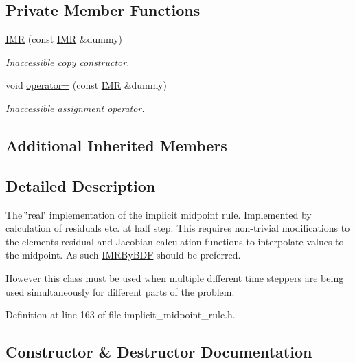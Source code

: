\subsection*{Private Member Functions}
\begin{DoxyCompactItemize}
\item 
\hyperlink{classoomph_1_1IMR_a1c55b18131b75531e320a50aeecdf00c}{I\+MR} (const \hyperlink{classoomph_1_1IMR}{I\+MR} \&dummy)
\begin{DoxyCompactList}\small\item\em Inaccessible copy constructor. \end{DoxyCompactList}\item 
void \hyperlink{classoomph_1_1IMR_a694b371e73e3ee940e3473d9a9add90f}{operator=} (const \hyperlink{classoomph_1_1IMR}{I\+MR} \&dummy)
\begin{DoxyCompactList}\small\item\em Inaccessible assignment operator. \end{DoxyCompactList}\end{DoxyCompactItemize}
\subsection*{Additional Inherited Members}


\subsection{Detailed Description}
The \char`\"{}real\char`\"{} implementation of the implicit midpoint rule. Implemented by calculation of residuals etc. at half step. This requires non-\/trivial modifications to the element\textquotesingle{}s residual and Jacobian calculation functions to interpolate values to the midpoint. As such \hyperlink{classoomph_1_1IMRByBDF}{I\+M\+R\+By\+B\+DF} should be preferred.

However this class must be used when multiple different time steppers are being used simultaneously for different parts of the problem. 

Definition at line 163 of file implicit\+\_\+midpoint\+\_\+rule.\+h.



\subsection{Constructor \& Destructor Documentation}
\mbox{\label{classoomph_1_1IMR_aa28c3f9d2eea177280f0868e16127285}} 
